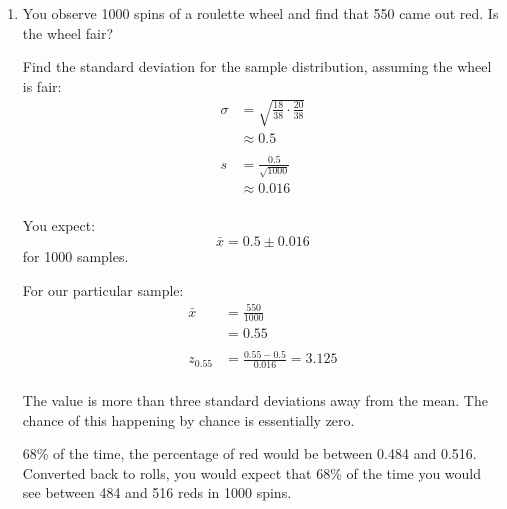 \documentclass[letterpaper,landscape]{exam}
\begin{document}
\begin{enumerate}
\begin{solution}
        

      \end{solution}

    \item You observe 1000 spins of a roulette wheel and find that 550 came out
      red. Is the wheel fair?

      \begin{solution}
        Find the standard deviation for the sample distribution, assuming the
        wheel is fair:
        \begin{align*}
          \sigma & = \sqrt{\frac{18}{38} \cdot \frac{20}{38}} \\
                 & \approx 0.5 \\
          \\
          s & = \frac{0.5}{\sqrt{1000}} \\
            & \approx 0.016 \\
        \end{align*}

        You expect:
        \[
          \bar{x} = 0.5 \pm 0.016
        \]
        for 1000 samples.

        For our particular sample:
        \begin{align*}
          \bar{x} & = \frac{550}{1000} \\
                  & = 0.55 \\
          \\
          z_{0.55} & = \frac{0.55 - 0.5}{0.016} = 3.125 \\
        \end{align*}

        The value is more than three standard deviations away from the mean. The
        chance of this happening by chance is essentially zero.

        68\% of the time, the percentage of red would be between 0.484 and
        0.516. Converted back to rolls, you would expect that 68\% of the time
        you would see between 484 and 516 reds in 1000 spins.

      \end{solution}
  \end{enumerate}
\end{document}
